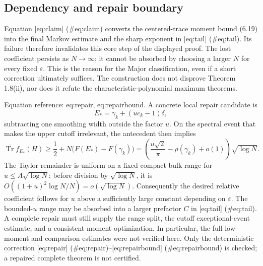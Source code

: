 \documentclass[10pt]{article}
\begin{document}
\subsection*{Dependency and repair boundary}
Equation [eq:claim] (\#eq:claim) converts the centered-trace moment bound (6.19) into the final Markov estimate and the sharp exponent in [eq:tail] (\#eq:tail). Its failure therefore invalidates this core step of the displayed proof. The lost coefficient persists as \(N\to\infty\); it cannot be absorbed by choosing a larger \(N\) for every fixed \(\varepsilon\). This is the reason for the Major classification, even if a short correction ultimately suffices. The construction does not disprove Theorem 1.8(ii), nor does it refute the characteristic-polynomial maximum theorems.\par
Equation reference: eq:repair, eq:repairbound. A concrete local repair candidate is \[E_*=\gamma_k+(u c_k-1)\delta,
 \] subtracting one smoothing width outside the factor \(u\). On the spectral event that makes the upper cutoff irrelevant, the antecedent then implies \[\overline{\operatorname{Tr}}f_{E_*}(H)
 \geq \frac12+N\bigl(F(E_*)-F(\gamma_k)\bigr)
 =\left(\frac{u\sqrt2}{\pi}-\rho(\gamma_k)+o(1)\right)\sqrt{\log N}.
 \] The Taylor remainder is uniform on a fixed compact bulk range for \(u\leq A\sqrt{\log N}\): before division by \(\sqrt{\log N}\), it is \(O((1+u)^2\log N/N)=o(\sqrt{\log N})\). Consequently the desired relative coefficient follows for \(u\) above a sufficiently large constant depending on \(\varepsilon\). The bounded-\(u\) range may be absorbed into a larger prefactor \(C\) in [eq:tail] (\#eq:tail). A complete repair must still supply the range split, the cutoff exceptional-event estimate, and a consistent moment optimization. In particular, the full low-moment and comparison estimates were not verified here. Only the deterministic correction [eq:repair] (\#eq:repair)–[eq:repairbound] (\#eq:repairbound) is checked; a repaired complete theorem is not certified.\par
\end{document}
